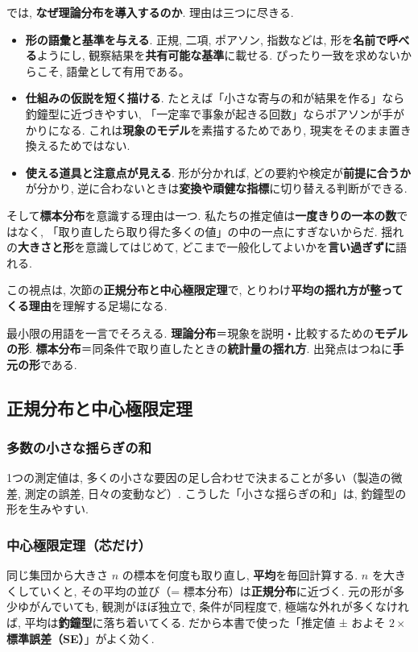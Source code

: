   では, \textbf{なぜ理論分布を導入するのか}. 理由は三つに尽きる.
  \begin{itemize}
    \item \textbf{形の語彙と基準を与える}. 正規, 二項, ポアソン, 指数などは, 形を\textbf{名前で呼べる}ようにし, 観察結果を\textbf{共有可能な基準}に載せる. ぴったり一致を求めないからこそ, 語彙として有用である。
    \item \textbf{仕組みの仮説を短く描ける}. たとえば「小さな寄与の和が結果を作る」なら釣鐘型に近づきやすい, 「一定率で事象が起きる回数」ならポアソンが手がかりになる.
          これは\textbf{現象のモデル}を素描するためであり, 現実をそのまま置き換えるためではない.
    \item \textbf{使える道具と注意点が見える}. 形が分かれば, どの要約や検定が\textbf{前提に合うか}が分かり, 逆に合わないときは\textbf{変換や頑健な指標}に切り替える判断ができる.
  \end{itemize}

  そして\textbf{標本分布}を意識する理由は一つ. 私たちの推定値は\textbf{一度きりの一本の数}ではなく, 「取り直したら取り得た多くの値」の中の一点にすぎないからだ.  
  揺れの\textbf{大きさと形}を意識してはじめて, どこまで一般化してよいかを\textbf{言い過ぎずに}語れる.  

  この視点は, 次節の\textbf{正規分布と中心極限定理}で, とりわけ\textbf{平均の揺れ方が整ってくる理由}を理解する足場になる.

  \medskip
  \noindent 最小限の用語を一言でそろえる.
  \textbf{理論分布}＝現象を説明・比較するための\textbf{モデルの形}.  
  \textbf{標本分布}＝同条件で取り直したときの\textbf{統計量の揺れ方}.  
  出発点はつねに\textbf{手元の形}である.

\subsection{正規分布と中心極限定理}
    \subsubsection*{多数の小さな揺らぎの和}
      1つの測定値は, 多くの小さな要因の足し合わせで決まることが多い（製造の微差, 測定の誤差, 日々の変動など）.  
      こうした「小さな揺らぎの和」は, 釣鐘型の形を生みやすい.

    \subsubsection*{中心極限定理（芯だけ）}
      同じ集団から大きさ $n$ の標本を何度も取り直し, \textbf{平均}を毎回計算する.  
      $n$ を大きくしていくと, その平均の並び（= 標本分布）は\textbf{正規分布}に近づく.  
      元の形が多少ゆがんでいても, 観測がほぼ独立で, 条件が同程度で, 極端な外れが多くなければ, 平均は\textbf{釣鐘型}に落ち着いてくる.  
      だから本書で使った「推定値 ± およそ $2\times$ \textbf{標準誤差（SE）}」がよく効く.

